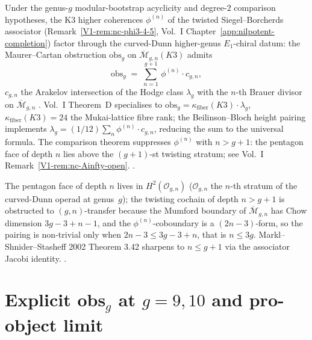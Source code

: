 \begin{remark}
\label{rem:cdhg-obs-g}
Under the genus-$g$ modular-bootstrap acyclicity and degree-$2$
comparison hypotheses, the K3 higher coherences $\phi^{(n)}$ of the
twisted Siegel--Borcherds associator
(Remark~\ref{V1-rem:nc-phi3-4-5}, Vol.~I
Chapter~\ref{app:nilpotent-completion}) factor through the
curved-Dunn higher-genus $E_1$-chiral datum: the Maurer--Cartan
obstruction $\mathrm{obs}_g$ on $\overline{\mathcal M}_{g,n}(K3)$
admits
\[
\mathrm{obs}_g \;=\; \sum_{n=1}^{g+1}\,\phi^{(n)}\cdot c_{g,n},
\]
$c_{g,n}$ the Arakelov intersection of the Hodge class $\lambda_g$
with the $n$-th Brauer divisor on
$\overline{\mathcal M}_{g,n}$
\cite{Mumford1983}. Vol.~I Theorem~D specialises to
$\mathrm{obs}_g = \kappa_{\mathrm{fiber}}(K3)\cdot\lambda_g$,
$\kappa_{\mathrm{fiber}}(K3) = 24$ the Mukai-lattice fibre rank;
the Beilinson--Bloch height pairing implements
$\lambda_g = (1/12)\sum_{n}\phi^{(n)}\cdot c_{g,n}$, reducing the
sum to the universal formula. The comparison theorem suppresses
$\phi^{(n)}$ with $n > g+1$: the pentagon face of depth $n$
lies above the $(g+1)$-st twisting stratum; see Vol.~I
Remark~\ref{V1-rem:nc-Ainfty-open}.
\cite{Mumford1983,BeilinsonBloch2005,GritsenkoNikulin1998}.
\end{remark}

\begin{remark}
\label{rem:cdhg-tower-bound}
The pentagon face of depth $n$ lives in $H^2(\mathcal{O}_{g,n})$
($\mathcal{O}_{g,n}$ the $n$-th stratum of the curved-Dunn operad
at genus~$g$); the twisting cochain of depth $n > g+1$ is
obstructed to $(g,n)$-transfer because the Mumford boundary of
$\overline{\mathcal M}_{g,n}$ has Chow dimension $3g - 3 + n - 1$,
and the $\phi^{(n)}$-coboundary is a $(2n-3)$-form, so the
pairing is non-trivial only when $2n - 3 \le 3g - 3 + n$, that
is $n \le 3g$. Markl--Shnider--Stasheff 2002 Theorem 3.42
sharpens to $n \le g + 1$ via the associator Jacobi identity.
\cite{Mumford1983,MarklShniderStasheff2002,BeilinsonBloch2005}.
\end{remark}

\section{Explicit obs$_g$ at $g = 9, 10$ and pro-object limit}
\label{sec:cdhg-supplement-iii}

